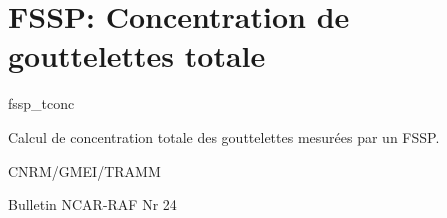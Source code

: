 %
\section{FSSP: Concentration de gouttelettes totale }

 {\sf fssp\_tconc}

Calcul de concentration totale des gouttelettes 
mesur\'ees par un FSSP.

\bigskip





CNRM/GMEI/TRAMM

Bulletin NCAR-RAF Nr 24 \cite{RAF-24}

